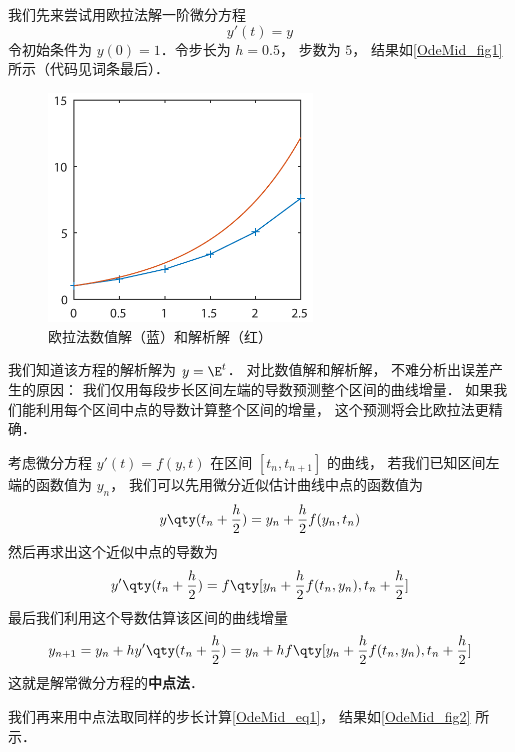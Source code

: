 

我们先来尝试用欧拉法解一阶微分方程
\begin{equation}\label{OdeMid_eq1}
y'(t) = y
\end{equation}
令初始条件为 $y(0) = 1$．令步长为 $h = 0.5$， 步数为 $5$， 结果如\autoref{OdeMid_fig1} 所示（代码见词条最后）．

\begin{figure}[ht]
\centering
\includegraphics[width=7cm]{./figures/OdeMid_1.pdf}
\caption{欧拉法数值解（蓝）和解析解（红）} \label{OdeMid_fig1}
\end{figure}

我们知道该方程的解析解为 $y = \E^{t}$． 对比数值解和解析解， 不难分析出误差产生的原因： 我们仅用每段步长区间左端的导数预测整个区间的曲线增量． 如果我们能利用每个区间中点的导数计算整个区间的增量， 这个预测将会比欧拉法更精确．

考虑微分方程 $y'(t) = f(y, t)$ 在区间 $[t_n, t_{n+1}]$ 的曲线， 若我们已知区间左端的函数值为 $y_n$， 我们可以先用微分近似估计曲线中点的函数值为
\begin{equation}
y \qty(t_n + \frac h2) = y_n + \frac h2 f(y_n, t_n)
\end{equation}
然后再求出这个近似中点的导数为
\begin{equation}
y' \qty(t_n + \frac h2) = f \qty[y_n + \frac h2 f(t_n, y_n), t_n + \frac h2]
\end{equation}
最后我们利用这个导数估算该区间的曲线增量
\begin{equation}
y_{n+1} = y_n + hy' \qty(t_n + \frac h2) = y_n + h f \qty[y_n + \frac h2 f(t_n, y_n), t_n + \frac h2]
\end{equation}
这就是解常微分方程的\textbf{中点法}．

我们再来用中点法取同样的步长计算\autoref{OdeMid_eq1}， 结果如\autoref{OdeMid_fig2} 所示．

